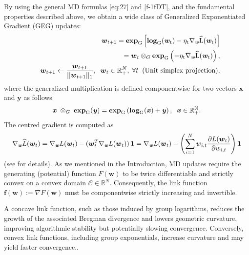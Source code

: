\documentclass[10pt]{amsart}
\newcommand{\beq}{\begin{equation}}
\newcommand{\eeq}{\end{equation}}
\newcommand{\bea}{\begin{eqnarray}}
\newcommand{\eea}{\end{eqnarray}}
\newcommand{\nn}{\nonumber}
\newcommand{\bi}[1]{\textbf{\textit{#1}}}
\newcommand{\bexp}{\rm{\bf{exp}}}
\newcommand{\blog}{\rm{\bf{log}}}
\newcommand{\bof}{\boldsymbol{f}}
\newcommand{\R}{\mathbb{R}}
\newcommand{\Rp}{\mathbb{R}^{N}_{+}}
\newcommand{\bx}{\boldsymbol{x}}
\newcommand{\by}{\boldsymbol{y}}
\newcommand{\bw}{\boldsymbol{w}}
\theoremstyle{definition}
\theoremstyle{definition}	 %
\begin{document}
By using the general MD formulas \eqref{eq:27} and \eqref{f-1fDT}, and the fundamental properties described above, we obtain a wide class of
Generalized Exponentiated Gradient (GEG) updates:
%
\bea \label{eq:41}
&& \bw_{t+1} = \bexp_{G} \left[\blog_G(\bi w_t) - \eta_t \nabla_{\bi w} \widehat{L}(\bi w_t)\right] \\ \nn
&& \hspace{10mm} = \bw_t \otimes_G \bexp_{G} \left(-\eta_t \nabla_{\bi w} \widehat{L}(\bi w_t)\right),  \\
  && \bw_{t+1} \leftarrow \frac{\bw_{t+1}}{||\bw_{t+1}||_1}, \;\; \bw_t \in \mathbb{R}^{N}_{+}, \; \forall t
\;\; \text{(Unit simplex projection)},
 \eea
where the generalized  multiplication is defined componentwise for two vectors $\bx$ and $\by$ as follows
\beq
 \bx \; \otimes_G \; \bexp_{G} (\bi y) = \bexp_{G} \left(\blog_{G} (\bi x) + \bi y\right), \;\; \bi x\in \Rp. \nonumber
\eeq
The centred gradient is computed as
\beq
	 \nabla_{\bi w} \widehat{L}(\bw_t)=
		\displaystyle
	  \nabla_{\bi w} L(\bw_t)- (\bw_t^T \nabla_{\bi w} L(\bw_t))\, {\bf 1}= \nabla_{\bi w} L(\bw_t)-  \left(\sum_{i=1}^{N} w_{i,t} \frac{\partial L(\bw_t)}{\partial w_{i,t}}\right) {\bf 1}	
	  \label{Grad-Lparc}
\eeq
(see \cite{Cichocki2024} for details).
%
As we mentioned in the Introduction, MD updates require the generating (potential) function $F(\bw)$ to be twice differentiable and strictly convex on a convex domain $\mathcal{C}\in \R^{N}$. Consequently, the link function $\bof(\bw):=\nabla F(\bw)$ must be componentwise strictly increasing and invertible.

A concave link function, such as those induced by group logarithms, reduces the growth of the associated Bregman divergence and lowers geometric curvature, improving algorithmic stability but potentially slowing convergence. Conversely, convex link functions, including group exponentials, increase curvature and may yield faster convergence..

\vspace{2mm}
\end{document}
